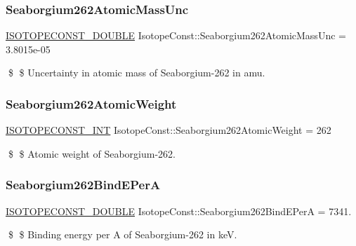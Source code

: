 \subsubsection{\texorpdfstring{Seaborgium262\+Atomic\+Mass\+Unc}{Seaborgium262AtomicMassUnc}}
{\footnotesize\ttfamily \mbox{\hyperlink{group___isotope_const-_macros_ga8f45a7272ce02c0b4c65c44636ed719a}{I\+S\+O\+T\+O\+P\+E\+C\+O\+N\+S\+T\+\_\+\+D\+O\+U\+B\+LE}} Isotope\+Const\+::\+Seaborgium262\+Atomic\+Mass\+Unc = 3.\+8015e-\/05}

\$ \$ Uncertainty in atomic mass of Seaborgium-\/262 in amu. \mbox{\label{group___isotope_const-_seaborgium-_sg262_gab06f6514b8a40fc2b538eda1022314d3}} 
\subsubsection{\texorpdfstring{Seaborgium262\+Atomic\+Weight}{Seaborgium262AtomicWeight}}
{\footnotesize\ttfamily \mbox{\hyperlink{group___isotope_const-_macros_ga5f18360b3e99483a35c32d789e62621c}{I\+S\+O\+T\+O\+P\+E\+C\+O\+N\+S\+T\+\_\+\+I\+NT}} Isotope\+Const\+::\+Seaborgium262\+Atomic\+Weight = 262}

\$ \$ Atomic weight of Seaborgium-\/262. \mbox{\label{group___isotope_const-_seaborgium-_sg262_ga3079cd9537535316652ea0b7ba8877ec}} 
\subsubsection{\texorpdfstring{Seaborgium262\+Bind\+E\+PerA}{Seaborgium262BindEPerA}}
{\footnotesize\ttfamily \mbox{\hyperlink{group___isotope_const-_macros_ga8f45a7272ce02c0b4c65c44636ed719a}{I\+S\+O\+T\+O\+P\+E\+C\+O\+N\+S\+T\+\_\+\+D\+O\+U\+B\+LE}} Isotope\+Const\+::\+Seaborgium262\+Bind\+E\+PerA = 7341.}

\$ \$ Binding energy per A of Seaborgium-\/262 in keV. \mbox{\label{group___isotope_const-_seaborgium-_sg262_ga690b349628997d30858538596a4db2de}} 
